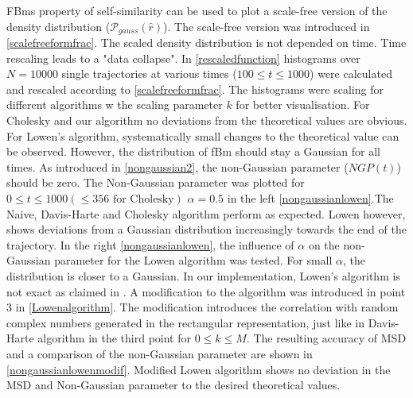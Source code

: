 \documentclass[
  a4paper,BCOR10mm,oneside,
  headsepline,footsepline,%
  fleqn,openbib
]{scrbook}
\begin{document}
FBms property of self-similarity can be used to plot a scale-free version of the density distribution ($\mathcal{P}_{gauss}(\hat{r})$). The scale-free version was introduced in \cref{scalefreeformfrac}. The scaled density distribution is not depended on time. Time rescaling leads to a "data collapse". In \cref{rescaledfunction}  histograms over $N=10000$ single trajectories at various times ($100\leq t \leq 1000$) were calculated and rescaled according to \cref{scalefreeformfrac}. The histograms were scaling for different algorithms w  the scaling parameter $k$ for better visualisation. For Cholesky and our algorithm no deviations from the theoretical values are obvious. For Lowen's algorithm, systematically small changes to the theoretical value can be observed. However, the distribution of fBm should stay a Gaussian for all times. As introduced in \cref{nongaussian2}, the non-Gaussian parameter ($NGP(t)$) should be zero. The Non-Gaussian parameter was plotted for $0 \leq t \leq 1000 (\leq 356 \text{ for Cholesky})$  $\alpha=0.5$ in the left \cref{nongaussianlowen}.The Naive, Davis-Harte and Cholesky algorithm perform as expected. Lowen however, shows deviations from a Gaussian distribution increasingly towards the end of the trajectory. In the right \cref{nongaussianlowen}, the influence of $\alpha$ on the non-Gaussian parameter for the Lowen algorithm was tested. For small $\alpha$, the distribution is closer to a Gaussian. In our implementation, Lowen's algorithm is not exact as claimed in \cite{Lowen1999}. A modification to the algorithm  was introduced in point 3 in \cref{Lowenalgorithm}. The modification introduces the correlation with random complex numbers generated in the rectangular representation, just like in Davis-Harte algorithm in the third point for $ 0 \leq k \leq M $. The resulting accuracy of MSD and a comparison of the non-Gaussian parameter are shown in \cref{nongaussianlowenmodif}. Modified Lowen algorithm shows no deviation in the MSD and Non-Gaussian parameter to the desired theoretical values.
\end{document}

